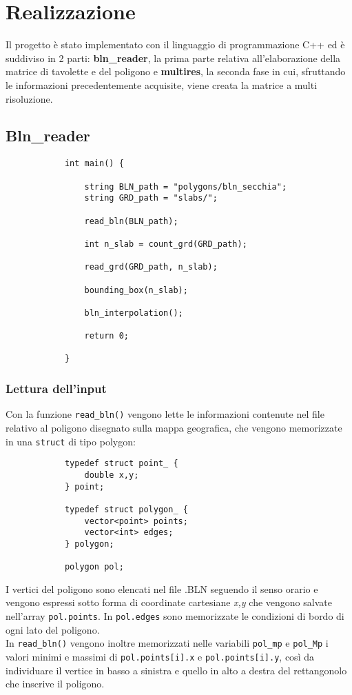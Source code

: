 \chapter{Realizzazione}
	Il progetto \`{e} stato implementato con il linguaggio di programmazione C++ ed \`{e} suddiviso in 2 parti: \textbf{bln\_reader}, la prima parte relativa all'elaborazione della matrice di tavolette e del poligono e \textbf{multires}, la seconda fase in cui, sfruttando le informazioni precedentemente acquisite, viene creata la matrice a multi risoluzione.

	\section{Bln\_reader}
		\begin{verbatim}
			int main() {

			    string BLN_path = "polygons/bln_secchia";
			    string GRD_path = "slabs/";

			    read_bln(BLN_path);

			    int n_slab = count_grd(GRD_path);

			    read_grd(GRD_path, n_slab);
				
			    bounding_box(n_slab);

			    bln_interpolation();

			    return 0;

			}
		\end{verbatim}
		\subsection{Lettura dell'input}
			Con la funzione \texttt{read\_bln()} vengono lette le informazioni contenute nel file relativo al poligono disegnato sulla mappa geografica, che vengono memorizzate in una \texttt{struct} di tipo polygon:  
		\begin{verbatim}
			typedef struct point_ {
			    double x,y;
			} point;

			typedef struct polygon_ {
			    vector<point> points; 
			    vector<int> edges;    
			} polygon;

			polygon pol;
		\end{verbatim} 
		I vertici del poligono sono elencati nel file .BLN seguendo il senso orario e vengono espressi sotto forma di coordinate cartesiane \textit{x,y} che vengono salvate nell'array \texttt{pol.points}. In \texttt{pol.edges} sono memorizzate le condizioni di bordo di ogni lato del poligono. \\
		In \texttt{read\_bln()} vengono inoltre memorizzati nelle variabili \texttt{pol\_mp} e \texttt{pol\_Mp} i valori minimi e massimi di \texttt{pol.points[i].x} e \texttt{pol.points[i].y}, cos\`{i} da individuare il vertice in basso a sinistra e quello in alto a destra del rettangonolo che inscrive il poligono.

